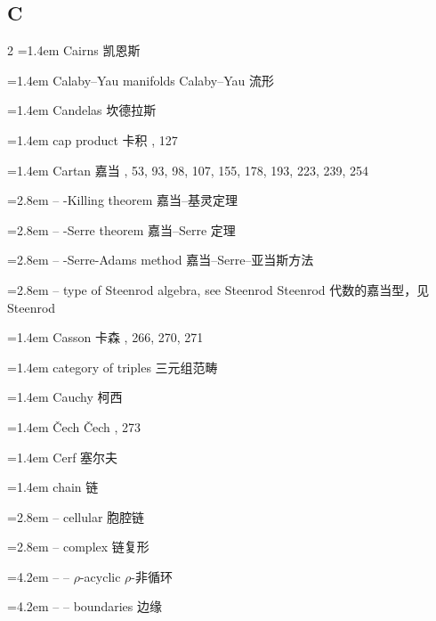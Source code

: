 \subsection*{C}
\small
\begin{multicols}{2}
\noindent\hangindent=1.4em Cairns \quad 凯恩斯 \par
\noindent\hangindent=1.4em Calaby--Yau manifolds \quad Calaby--Yau 流形 \par
\noindent\hangindent=1.4em Candelas \quad 坎德拉斯 \par
\noindent\hangindent=1.4em cap product \quad 卡积 , 127\par
\noindent\hangindent=1.4em Cartan \quad 嘉当 , 53, 93, 98, 107, 155, 178, 193, 223, 239, 254\par
\noindent\hangindent=2.8em -- -Killing theorem \quad 嘉当--基灵定理 \par
\noindent\hangindent=2.8em -- -Serre theorem \quad 嘉当--Serre 定理 \par
\noindent\hangindent=2.8em -- -Serre-Adams method \quad 嘉当--Serre--亚当斯方法 \par
\noindent\hangindent=2.8em -- type of Steenrod algebra, see Steenrod \quad Steenrod 代数的嘉当型，见 Steenrod \quad\par
\noindent\hangindent=1.4em Casson \quad 卡森 , 266, 270, 271\par
\noindent\hangindent=1.4em category of triples \quad 三元组范畴 \par
\noindent\hangindent=1.4em Cauchy \quad 柯西 \par
\noindent\hangindent=1.4em \v{C}ech \quad \v{C}ech , 273\par
\noindent\hangindent=1.4em Cerf \quad 塞尔夫 \par
\noindent\hangindent=1.4em chain \quad 链 \quad\par
\noindent\hangindent=2.8em -- cellular \quad 胞腔链 \par
\noindent\hangindent=2.8em -- complex \quad 链复形 \par
\noindent\hangindent=4.2em -- -- $\rho$-acyclic \quad $\rho$-非循环 \par
\noindent\hangindent=4.2em -- -- boundaries \quad 边缘 \par

\end{multicols}
